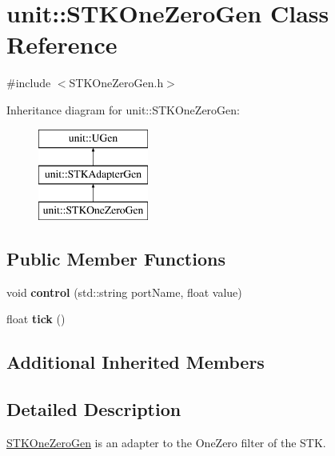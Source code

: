 \hypertarget{classunit_1_1STKOneZeroGen}{}\section{unit\+:\+:S\+T\+K\+One\+Zero\+Gen Class Reference}
\label{classunit_1_1STKOneZeroGen}


{\ttfamily \#include $<$S\+T\+K\+One\+Zero\+Gen.\+h$>$}

Inheritance diagram for unit\+:\+:S\+T\+K\+One\+Zero\+Gen\+:\begin{figure}[H]
\begin{center}
\leavevmode
\includegraphics[height=3.000000cm]{classunit_1_1STKOneZeroGen}
\end{center}
\end{figure}
\subsection*{Public Member Functions}
\begin{DoxyCompactItemize}
\item 
void {\bfseries control} (std\+::string port\+Name, float value)\hypertarget{classunit_1_1STKOneZeroGen_a44bc26cf6f0e7218f9f14447c957dce4}{}\label{classunit_1_1STKOneZeroGen_a44bc26cf6f0e7218f9f14447c957dce4}

\item 
float {\bfseries tick} ()\hypertarget{classunit_1_1STKOneZeroGen_ab1118ea13c6892f49c8f92f017b82908}{}\label{classunit_1_1STKOneZeroGen_ab1118ea13c6892f49c8f92f017b82908}

\end{DoxyCompactItemize}
\subsection*{Additional Inherited Members}


\subsection{Detailed Description}
\hyperlink{classunit_1_1STKOneZeroGen}{S\+T\+K\+One\+Zero\+Gen} is an adapter to the One\+Zero filter of the S\+TK.


